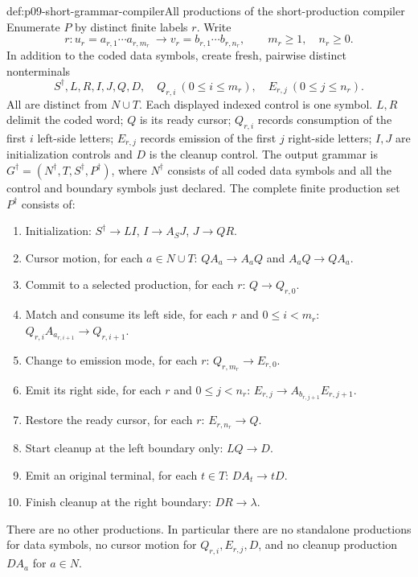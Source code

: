 \begin{hbdefinition}{def:p09-short-grammar-compiler}{All productions of the short-production compiler}
Enumerate \(P\) by distinct finite labels \(r\). Write
\[
 r:u_r=a_{r,1}\cdots a_{r,m_r}\ \to
 v_r=b_{r,1}\cdots b_{r,n_r},
 \qquad m_r\geq1,\quad n_r\geq0.
\]
In addition to the coded data symbols, create fresh, pairwise distinct
nonterminals
\[
 S^\dagger,L,R,I,J,Q,D,
 \quad Q_{r,i}\ (0\leq i\leq m_r),
 \quad E_{r,j}\ (0\leq j\leq n_r).
\]
All are distinct from \(N\cup T\). Each displayed indexed control is
one symbol. \(L,R\) delimit the coded word; \(Q\) is its ready cursor;
\(Q_{r,i}\) records consumption of the first \(i\) left-side letters;
\(E_{r,j}\) records emission of the first \(j\) right-side letters;
\(I,J\) are initialization controls and \(D\) is the cleanup control.
The output grammar is \(G^\dagger=(N^\dagger,T,S^\dagger,P^\dagger)\),
where \(N^\dagger\) consists of all coded data symbols and all the
control and boundary symbols just declared.
The complete finite production set \(P^\dagger\) consists of:
\begin{enumerate}
\item Initialization:
 \(S^\dagger\to LI\), \(I\to A_SJ\), \(J\to QR\).
\item Cursor motion, for each \(a\in N\cup T\):
 \(QA_a\to A_aQ\) and \(A_aQ\to QA_a\).
\item Commit to a selected production, for each \(r\):
 \(Q\to Q_{r,0}\).
\item Match and consume its left side, for each \(r\) and \(0\leq i<m_r\):
 \(Q_{r,i}A_{a_{r,i+1}}\to Q_{r,i+1}\).
\item Change to emission mode, for each \(r\):
 \(Q_{r,m_r}\to E_{r,0}\).
\item Emit its right side, for each \(r\) and \(0\leq j<n_r\):
 \(E_{r,j}\to A_{b_{r,j+1}}E_{r,j+1}\).
\item Restore the ready cursor, for each \(r\):
 \(E_{r,n_r}\to Q\).
\item Start cleanup at the left boundary only: \(LQ\to D\).
\item Emit an original terminal, for each \(t\in T\):
 \(DA_t\to tD\).
\item Finish cleanup at the right boundary: \(DR\to\lambda\).
\end{enumerate}
There are no other productions. In particular there are no standalone
productions for data symbols, no cursor motion for \(Q_{r,i},E_{r,j},D\),
and no cleanup production \(DA_a\) for \(a\in N\).
\end{hbdefinition}

